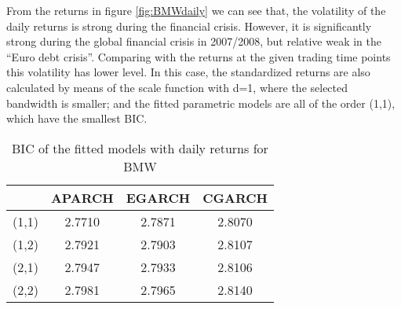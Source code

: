 From the returns in figure \ref{fig:BMWdaily} we can see that, the volatility of the daily returns is strong during the financial crisis. However, it is significantly strong during the global financial crisis in 2007/2008, but relative weak in the ``Euro debt crisis''. Comparing with the returns at the given trading time points this volatility has lower level. In this case, the standardized returns are also calculated by means of the scale function with d=1, where the selected bandwidth is smaller; and the fitted parametric models are all of the order (1,1), which have the smallest BIC.



\begin{table}[!h]
 \small
  \centering
  \vspace{2ex} 
\begin{tabular}{c|c|c|c}
\toprule
	 &	APARCH	& EGARCH	& CGARCH \\
\midrule
\hline		 
(1,1) &	2.7710	& 2.7871	& 2.8070 \\
(1,2) &	2.7921	& 2.7903	& 2.8107 \\
(2,1) &	2.7947	& 2.7933	& 2.8106 \\
(2,2) &	2.7981	& 2.7965	& 2.8140 \\
\bottomrule

\end{tabular}
  \caption{BIC of the fitted models with daily returns for BMW}
  \label{tab:dailyBICforBMW}
\end{table}




